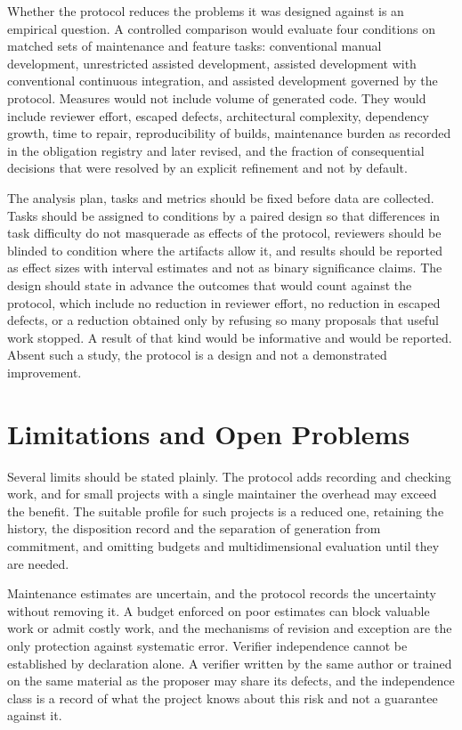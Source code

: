 \documentclass[11pt]{article}
\theoremstyle{remark}
\begin{document}
Whether the protocol reduces the problems it was designed against is an empirical question. A controlled comparison would evaluate four conditions on matched sets of maintenance and feature tasks: conventional manual development, unrestricted assisted development, assisted development with conventional continuous integration, and assisted development governed by the protocol. Measures would not include volume of generated code. They would include reviewer effort, escaped defects, architectural complexity, dependency growth, time to repair, reproducibility of builds, maintenance burden as recorded in the obligation registry and later revised, and the fraction of consequential decisions that were resolved by an explicit refinement and not by default.

The analysis plan, tasks and metrics should be fixed before data are collected. Tasks should be assigned to conditions by a paired design so that differences in task difficulty do not masquerade as effects of the protocol, reviewers should be blinded to condition where the artifacts allow it, and results should be reported as effect sizes with interval estimates and not as binary significance claims. The design should state in advance the outcomes that would count against the protocol, which include no reduction in reviewer effort, no reduction in escaped defects, or a reduction obtained only by refusing so many proposals that useful work stopped. A result of that kind would be informative and would be reported. Absent such a study, the protocol is a design and not a demonstrated improvement.

\section{Limitations and Open Problems}\label{sec:limits}

Several limits should be stated plainly. The protocol adds recording and checking work, and for small projects with a single maintainer the overhead may exceed the benefit. The suitable profile for such projects is a reduced one, retaining the history, the disposition record and the separation of generation from commitment, and omitting budgets and multidimensional evaluation until they are needed.

Maintenance estimates are uncertain, and the protocol records the uncertainty without removing it. A budget enforced on poor estimates can block valuable work or admit costly work, and the mechanisms of revision and exception are the only protection against systematic error. Verifier independence cannot be established by declaration alone. A verifier written by the same author or trained on the same material as the proposer may share its defects, and the independence class is a record of what the project knows about this risk and not a guarantee against it.
\end{document}
